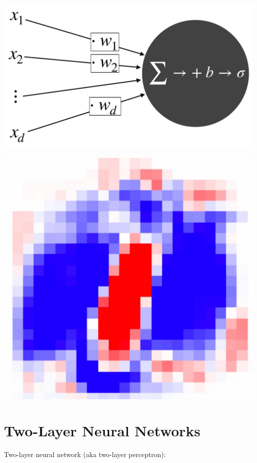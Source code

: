 \documentclass[10pt]{article}
\begin{document}
\begin{center}
\includegraphics[max width=\textwidth]{2024_01_08_0e0dcffe4bc8c6049046g-06(1)}
\end{center}

\begin{center}
\includegraphics[max width=\textwidth]{2024_01_08_0e0dcffe4bc8c6049046g-06}
\end{center}

\section*{Two-Layer Neural Networks}
Two-layer neural network (aka two-layer perceptron):
\end{document}
